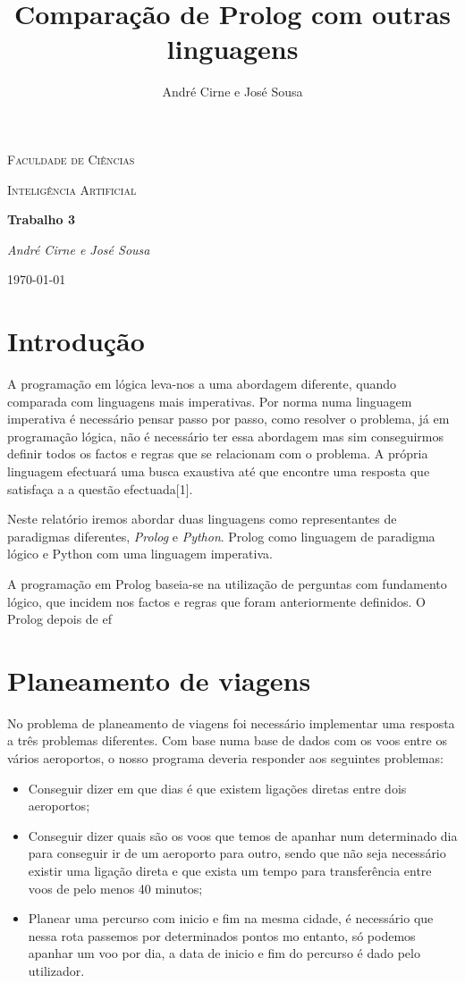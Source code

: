 \documentclass[12pt,a4paper]{article}
\author{André Cirne e José Sousa}
\title{Comparação de Prolog com outras linguagens}
\begin{document}
\begin{titlepage}
	\centering
	{\scshape\LARGE Faculdade de Ciências \par}
	\vspace{1cm}
	{\scshape\Large Inteligência Artificial\par}
	\vspace{1.5cm}
	{\huge\bfseries Trabalho 3\par}
	\vspace{2cm}
	{\Large\itshape André Cirne e José Sousa\par}
	\vfill

	{\large \today\par}
\end{titlepage}

\tableofcontents
\section{Introdução}
A programação em lógica leva-nos a uma abordagem diferente, quando comparada com linguagens mais imperativas. Por norma numa linguagem imperativa é necessário pensar passo por passo, como resolver o problema, já em programação lógica, não é necessário ter essa abordagem mas sim conseguirmos definir todos os factos e regras que se relacionam com o problema. A própria linguagem efectuará uma busca exaustiva até que encontre uma resposta que satisfaça a a questão efectuada[1].

Neste relatório iremos abordar duas linguagens como representantes de paradigmas diferentes, \textit{Prolog} e \textit{Python}. Prolog como linguagem de paradigma lógico e Python com uma linguagem imperativa.

A programação em Prolog baseia-se na utilização de perguntas com fundamento lógico, que incidem nos factos e regras que foram anteriormente definidos. O Prolog depois de ef
\section{Planeamento de viagens}
No problema de planeamento de viagens foi necessário implementar uma resposta a três problemas diferentes. Com base numa base de dados com os voos entre os vários aeroportos, o nosso programa deveria responder aos seguintes problemas: 
\begin{itemize}
 \item Conseguir dizer em que dias é que existem ligações diretas entre dois aeroportos;
 \item Conseguir dizer quais são os voos que temos de apanhar num determinado dia para conseguir ir de um aeroporto para outro, sendo que não seja necessário existir uma ligação direta e que exista um tempo para transferência entre voos de pelo menos 40 minutos;
 \item Planear uma percurso com inicio e fim na mesma cidade, é necessário que nessa rota passemos por determinados pontos mo entanto, só podemos apanhar um voo por dia, a data de inicio e fim do percurso é dado pelo utilizador.   
\end{itemize}
\end{document}
